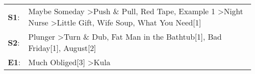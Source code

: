 \begin{supertabular}{p{0.03\textwidth}p{0.92\textwidth}}
 \textbf{S1}:  &  Maybe Someday\textsuperscript{} \textgreater \enspace Push \& Pull\textsuperscript{}, \enspace Red Tape\textsuperscript{}, \enspace Example 1\textsuperscript{} \textgreater \enspace Night Nurse\textsuperscript{} \textgreater \enspace Little Gift\textsuperscript{}, \enspace Wife Soup\textsuperscript{}, \enspace What You Need[1]\textsuperscript{}  \enspace  \\
 \textbf{S2}:  &                                                                                                                                         Plunger\textsuperscript{} \textgreater \enspace Turn \& Dub\textsuperscript{}, \enspace Fat Man in the Bathtub[1]\textsuperscript{}, \enspace Bad Friday[1]\textsuperscript{}, \enspace August[2]\textsuperscript{}  \enspace  \\
 \textbf{E1}:  &                                                                                                                                                                                                                                                                              Much Obliged[3]\textsuperscript{} \textgreater \enspace Kula\textsuperscript{}  \enspace  \\
\end{supertabular}
